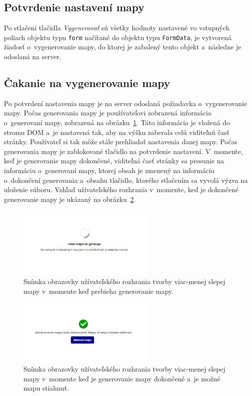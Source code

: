 \subsection*{Potvrdenie nastavení mapy}
\label{map_confirm}
Po stlačení tlačidla {\it Vygenerovať} sú všetky hodnoty nastavené vo vstupných poliach objektu typu {\tt form} načítané do objektu typu {\tt FormData}, je vytvorená žiadosť o~vygenerovanie mapy, do ktorej je zabalený tento objekt a~následne je odoslaná na server.

\subsection*{Čakanie na vygenerovanie mapy}
\label{map_wait}
Po potvrdení nastavenia mapy je na server odoslaná požiadavka o~vygenerovanie mapy. Počas generovania mapy je používateľovi zobrazená informácia o~generovaní mapy, zobrazená na obrázku~\ref{img_waiting}. Táto informácia je vložená do stromu DOM a~je nastavená tak, aby na výšku zaberala celú viditeľnú časť stránky. Používateľ si tak môže stále prehliadať nastavenia danej mapy. Počas generovania mapy je zablokované tlačidlo na potvrdenie nastavení. V~momente, keď je generovanie mapy dokončené, viditeľná časť stránky sa presunie na informáciu o~generovaní mapy, ktorej obsah je zmenený na informáciu o~dokončení generovania a~obsahu tlačidlo, ktorého stlačením sa vyvolá výzva na uloženie súboru. Vzhľad užívateľského rozhrania v~momente, keď je dokončené generovanie mapy je ukázaný na obrázku~\ref{img_done}.

\begin{figure}[hbt]
	\centering
	\includegraphics[width=0.6\textwidth]{obrazky-figures/img_waiting.png}
	\caption{Snímka obrazovky užívateľského rozhrania tvorby viac-menej slepej mapy v~momente keď prebieha generovanie mapy.}
	\label{img_waiting}
\end{figure}

\begin{figure}[hbt]
	\centering
	\includegraphics[width=0.6\textwidth]{obrazky-figures/img_done.png}
	\caption{Snímka obrazovky užívateľského rozhrania tvorby viac-menej slepej mapy v~momente keď je generovanie mapy dokončené a~je možné mapu stiahnuť.}
	\label{img_done}
\end{figure}

